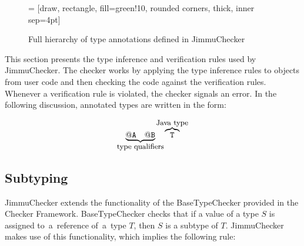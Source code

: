 \documentclass{pracamgr}
\theoremstyle{break}
\theoremstyle{break}
\theoremstyle{break}
\begin{document}
\begin{figure}[pt]
  \centering
   = [draw, rectangle, fill=green!10, rounded corners, thick, inner sep=4pt]    
  \caption{Full hierarchy of type annotations defined in JimmuChecker}
  \label{fig:hierarchy}
\end{figure}

This section presents the type inference and verification rules used
by JimmuChecker. The checker works by applying the type inference
rules to objects from user code and then checking the code against the
verification rules. Whenever a verification rule is violated, the
checker signals an error. In the following discussion, annotated types
are written in the form:

$$\underbrace{\mathtt{@A\quad @B}}_{\mathclap{\textrm{\small{type qualifiers}}}}\quad \overbrace{\mathtt{T}}^{\mathclap{\textrm{\small{Java type}}}}$$

\subsection{Subtyping}
\label{sec:chk:hierarchy}

JimmuChecker extends the functionality of the BaseTypeChecker
provided in the Checker Framework. BaseTypeChecker checks that if a
value of a type $S$ is assigned to~a~reference of~a~type $T$, then $S$
is a subtype of $T$. JimmuChecker makes use of this functionality,
which implies the following rule:
\end{document}
